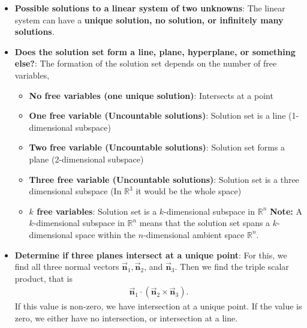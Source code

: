 \documentclass{report}
\begin{document}
    \begin{itemize}
        \item \textbf{Possible solutions to a linear system of two unknowns}: The linear system can have a \textbf{unique solution, no solution, or infinitely many solutions}.
            \item \textbf{Does the solution set form a line, plane, hyperplane, or something else?}: The formation of the solution set depends on the number of free variables,
                \begin{itemize}
                    \item \textbf{No free variables (one unique solution)}: Intersects at a point
                    \item \textbf{One free variable (Uncountable solutions)}: Solution set is a line (1-dimensional subspace)
                    \item \textbf{Two free variable (Uncountable solutions)}: Solution set forms a plane (2-dimensional subspace)
                    \item \textbf{Three free variable (Uncountable solutions)}: Solution set is a three dimensional subspace (In $\mathbb{R}^{3}$ it would be the whole space)
                    \item \textbf{$k$ free variables}: Solution set is a $k$-dimensional subspace in $\mathbb{R}^{n} $
                        \bigbreak \noindent 
                        \textbf{Note:} A \( k \)-dimensional subspace in \( \mathbb{R}^n \) means that the solution set spans a \( k \)-dimensional space within the \( n \)-dimensional ambient space \( \mathbb{R}^n \).

                \end{itemize}

        \item \textbf{Determine if three planes intersect at a unique point}: For this, we find all three normal vectors $\vec{\mathbf{n}}_{1}, \vec{\mathbf{n}}_{2}$, and $\vec{\mathbf{n}}_{3}$. Then we find the triple scalar product, that is
            \begin{align*}
                \vec{\mathbf{n}}_{1} \cdot (\vec{\mathbf{n}}_{2} \times \vec{\mathbf{n}}_{3})
            .\end{align*}
            If this value is non-zero, we have intersection at a unique point. If the value is zero, we either have no intersection, or intersection at a line.

    \end{itemize}
\end{document}
